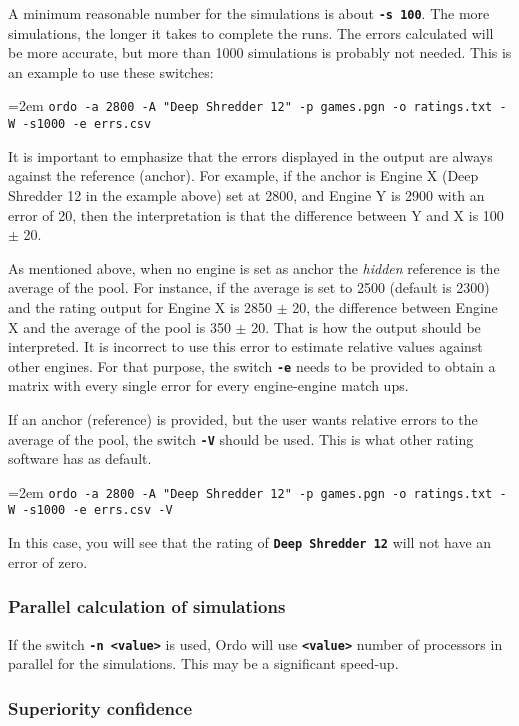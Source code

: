 \documentclass[12pt]{article}
\newcommand{\swtch} [1] {\texttt{\textbf{#1}}}
\newcommand{\cmdln}[1]{
	\par
	\begingroup
		\leftskip=2em
		\addtolength{\rightskip}{0em}
		\noindent \small{\texttt{#1}}
		\par
	\endgroup
}
\begin{document}
A minimum reasonable number for the simulations is about \swtch{-s~100}. 
The more simulations, the longer it takes to complete the runs. 
The errors calculated will be more accurate, but more than 1000 simulations is probably not needed. 
This is an example to use these switches:

\cmdln{ordo -a 2800 -A "Deep Shredder 12" -p games.pgn -o ratings.txt -W -s1000 -e errs.csv}

It is important to emphasize that the errors displayed in the output are always against the reference (anchor). 
For example, if the anchor is Engine X (Deep Shredder 12 in the example above) set at 2800, and Engine Y is 2900 with an error of 20, then the interpretation is that the difference between Y and X is 100 $\pm$ 20. 

As mentioned above, when no engine is set as anchor the \textit{hidden} reference is the average of the pool. 
For instance, if the average is set to 2500 (default is 2300) and the rating output for Engine X is 2850 $\pm$ 20, the difference between Engine X and the average of the pool is 350 $\pm$ 20. 
That is how the output should be interpreted. 
It is incorrect to use this error to estimate relative values against other engines. 
For that purpose, the switch \swtch{-e} needs to be provided to obtain a matrix with every single error for every engine-engine match ups.

If an anchor (reference) is provided, but the user wants relative errors to the average of the pool, the switch \swtch{-V} should be used. 
This is what other rating software has as default.

\cmdln{ordo -a 2800 -A "Deep Shredder 12" -p games.pgn -o ratings.txt -W -s1000 -e errs.csv -V}

In this case, you will see that the rating of \swtch{Deep Shredder 12} will not have an error of zero.

\subsubsection*{Parallel calculation of simulations}

If the switch \swtch{-n <value>} is used, Ordo will use \swtch{<value>} number of processors in parallel for the simulations.
This may be a significant speed-up.

\subsubsection*{Superiority confidence}
\end{document}
